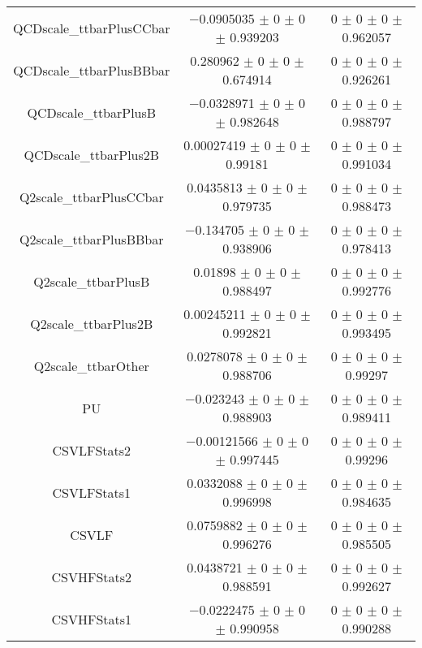 \begin{table}
\begin{tabular}{ccc}
QCDscale\_ttbarPlusCCbar & \num{-0.0905035} $\pm$ \num{0} $\pm$ \num{0} $\pm$ \num{0.939203} & \num{0} $\pm$ \num{0} $\pm$ \num{0} $\pm$ \num{0.962057}\\
QCDscale\_ttbarPlusBBbar & \num{0.280962} $\pm$ \num{0} $\pm$ \num{0} $\pm$ \num{0.674914} & \num{0} $\pm$ \num{0} $\pm$ \num{0} $\pm$ \num{0.926261}\\
QCDscale\_ttbarPlusB & \num{-0.0328971} $\pm$ \num{0} $\pm$ \num{0} $\pm$ \num{0.982648} & \num{0} $\pm$ \num{0} $\pm$ \num{0} $\pm$ \num{0.988797}\\
QCDscale\_ttbarPlus2B & \num{0.00027419} $\pm$ \num{0} $\pm$ \num{0} $\pm$ \num{0.99181} & \num{0} $\pm$ \num{0} $\pm$ \num{0} $\pm$ \num{0.991034}\\
Q2scale\_ttbarPlusCCbar & \num{0.0435813} $\pm$ \num{0} $\pm$ \num{0} $\pm$ \num{0.979735} & \num{0} $\pm$ \num{0} $\pm$ \num{0} $\pm$ \num{0.988473}\\
Q2scale\_ttbarPlusBBbar & \num{-0.134705} $\pm$ \num{0} $\pm$ \num{0} $\pm$ \num{0.938906} & \num{0} $\pm$ \num{0} $\pm$ \num{0} $\pm$ \num{0.978413}\\
Q2scale\_ttbarPlusB & \num{0.01898} $\pm$ \num{0} $\pm$ \num{0} $\pm$ \num{0.988497} & \num{0} $\pm$ \num{0} $\pm$ \num{0} $\pm$ \num{0.992776}\\
Q2scale\_ttbarPlus2B & \num{0.00245211} $\pm$ \num{0} $\pm$ \num{0} $\pm$ \num{0.992821} & \num{0} $\pm$ \num{0} $\pm$ \num{0} $\pm$ \num{0.993495}\\
Q2scale\_ttbarOther & \num{0.0278078} $\pm$ \num{0} $\pm$ \num{0} $\pm$ \num{0.988706} & \num{0} $\pm$ \num{0} $\pm$ \num{0} $\pm$ \num{0.99297}\\
PU & \num{-0.023243} $\pm$ \num{0} $\pm$ \num{0} $\pm$ \num{0.988903} & \num{0} $\pm$ \num{0} $\pm$ \num{0} $\pm$ \num{0.989411}\\
CSVLFStats2 & \num{-0.00121566} $\pm$ \num{0} $\pm$ \num{0} $\pm$ \num{0.997445} & \num{0} $\pm$ \num{0} $\pm$ \num{0} $\pm$ \num{0.99296}\\
CSVLFStats1 & \num{0.0332088} $\pm$ \num{0} $\pm$ \num{0} $\pm$ \num{0.996998} & \num{0} $\pm$ \num{0} $\pm$ \num{0} $\pm$ \num{0.984635}\\
CSVLF & \num{0.0759882} $\pm$ \num{0} $\pm$ \num{0} $\pm$ \num{0.996276} & \num{0} $\pm$ \num{0} $\pm$ \num{0} $\pm$ \num{0.985505}\\
CSVHFStats2 & \num{0.0438721} $\pm$ \num{0} $\pm$ \num{0} $\pm$ \num{0.988591} & \num{0} $\pm$ \num{0} $\pm$ \num{0} $\pm$ \num{0.992627}\\
CSVHFStats1 & \num{-0.0222475} $\pm$ \num{0} $\pm$ \num{0} $\pm$ \num{0.990958} & \num{0} $\pm$ \num{0} $\pm$ \num{0} $\pm$ \num{0.990288}\\

\end{tabular}
\end{table}
